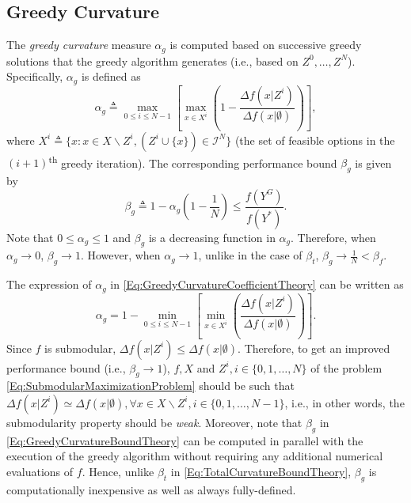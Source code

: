 \documentclass[conference]{IEEEtran}
\newcommand{\tsup}[1]{\textsuperscript{#1}}
\begin{document}
\subsection{Greedy Curvature \cite{Conforti1984}}
\label{SubSec:GreedyCurvature}



The \emph{greedy curvature} measure $\alpha_g$ is computed based on successive greedy solutions that the greedy algorithm generates (i.e., based on $Z^0,\ldots,Z^N$). Specifically, $\alpha_g$ is defined as   
\begin{equation}\label{Eq:GreedyCurvatureCoefficientTheory}
    \alpha_g \triangleq \max_{0 \leq i \leq N-1} \left[ \max_{x \in X^i}\left(1 - \frac{\Delta f(x\vert Z^i)}{\Delta f(x\vert \emptyset)}\right) \right],
\end{equation}
where $X^i \triangleq \{x: x \in X \backslash Z^i, (Z^i \cup \{x\}) \in \mathcal{I}^N\}$ (the set of feasible options in the $(i+1)$\tsup{th} greedy iteration). The corresponding performance bound $\beta_g$ is given by  
\begin{equation}\label{Eq:GreedyCurvatureBoundTheory}
    \beta_g \triangleq 1-\alpha_g\left(1-\frac{1}{N}\right) \leq \frac{f(Y^G)}{f(Y^*)}. 
\end{equation}
Note that $0 \leq \alpha_g \leq 1$ and $\beta_g$ is a decreasing function in $\alpha_g$. Therefore, when $\alpha_g \rightarrow 0$, $\beta_g \rightarrow 1$. However, when $\alpha_g \rightarrow 1$, unlike in the case of $\beta_t$,  $\beta_g \rightarrow \frac{1}{N} < \beta_f$. 


The expression of $\alpha_g$ in \eqref{Eq:GreedyCurvatureCoefficientTheory} can be written as
\begin{equation*}
    \alpha_g = 1 - \min_{0 \leq i \leq N-1} \left[ \min_{x \in X^i}\left(\frac{\Delta f(x\vert Z^i)}{\Delta f(x\vert \emptyset)}\right) \right].
\end{equation*}
Since $f$ is submodular, $\Delta f(x\vert Z^i) \leq \Delta f(x\vert \emptyset)$. Therefore, to get an improved performance bound (i.e., $\beta_g\rightarrow 1$), $f, X$ and $Z^i, i \in \{0,1,\ldots,N\}$ of the problem \eqref{Eq:SubmodularMaximizationProblem} should be such that $\Delta f(x\vert Z^i) \simeq \Delta f(x\vert \emptyset), \forall x \in X\backslash Z^i, i \in \{0,1,\ldots,N-1\}$, i.e., in other words, the submodularity property should be \emph{weak}. Moreover, note that $\beta_g$ in \eqref{Eq:GreedyCurvatureBoundTheory} can be computed in parallel with the execution of the greedy algorithm without requiring any additional numerical evaluations of $f$. Hence, unlike $\beta_t$ in \eqref{Eq:TotalCurvatureBoundTheory}, $\beta_g$ is computationally inexpensive as well as always fully-defined. 
\end{document}
